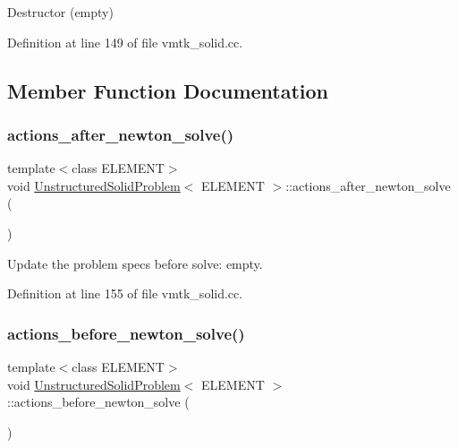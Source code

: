 Destructor (empty) 



Definition at line 149 of file vmtk\+\_\+solid.\+cc.



\subsection{Member Function Documentation}
\mbox{\label{classUnstructuredSolidProblem_a57946bc2c0d083d74c3e9416f882f7c0}} 
\subsubsection{\texorpdfstring{actions\+\_\+after\+\_\+newton\+\_\+solve()}{actions\_after\_newton\_solve()}}
{\footnotesize\ttfamily template$<$class E\+L\+E\+M\+E\+NT$>$ \\
void \hyperlink{classUnstructuredSolidProblem}{Unstructured\+Solid\+Problem}$<$ E\+L\+E\+M\+E\+NT $>$\+::actions\+\_\+after\+\_\+newton\+\_\+solve (\begin{DoxyParamCaption}{ }\end{DoxyParamCaption})\hspace{0.3cm}{\ttfamily [inline]}}



Update the problem specs before solve\+: empty. 



Definition at line 155 of file vmtk\+\_\+solid.\+cc.

\mbox{\label{classUnstructuredSolidProblem_af8139cf00952aaf56cea69ec5859b742}} 
\subsubsection{\texorpdfstring{actions\+\_\+before\+\_\+newton\+\_\+solve()}{actions\_before\_newton\_solve()}}
{\footnotesize\ttfamily template$<$class E\+L\+E\+M\+E\+NT$>$ \\
void \hyperlink{classUnstructuredSolidProblem}{Unstructured\+Solid\+Problem}$<$ E\+L\+E\+M\+E\+NT $>$\+::actions\+\_\+before\+\_\+newton\+\_\+solve (\begin{DoxyParamCaption}{ }\end{DoxyParamCaption})\hspace{0.3cm}{\ttfamily [inline]}}




